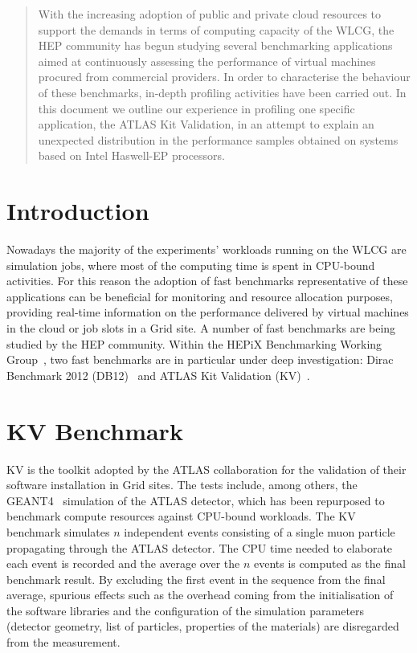 \begin{abstract}
With the increasing adoption of public and private cloud resources to support
the demands in terms of computing capacity of the WLCG, the HEP community has begun
studying several benchmarking applications aimed at continuously assessing the
performance of virtual machines procured from commercial providers.
In order to characterise the behaviour of these benchmarks, in-depth
profiling activities have been carried out. In this document we outline
our experience in profiling one specific application, the ATLAS Kit Validation,
in an attempt to explain an unexpected distribution in the performance samples
obtained on systems based on Intel Haswell-EP processors.
\end{abstract}


\section{Introduction}
Nowadays the majority of the experiments' workloads running on the WLCG are simulation 
jobs, where most of the computing time is spent in CPU-bound activities. For this 
reason the adoption of fast benchmarks representative of these applications
can be beneficial for monitoring and resource allocation purposes,
providing real-time information on the performance delivered by virtual 
machines in the cloud or job slots in a Grid site.
A number of fast benchmarks are being studied by the HEP community. Within the 
HEPiX Benchmarking Working Group~\cite{HEPiX:2014:HEPiX}, two fast benchmarks are 
in particular under deep investigation: Dirac Benchmark 2012 (DB12)~\cite{CERN:2016:DB12} 
and ATLAS Kit Validation (KV)~\cite{KV}.

\section{KV Benchmark}
KV is the toolkit adopted by the ATLAS collaboration for the
validation of their software installation in Grid sites. The tests include, among
others, the GEANT4~\cite{GEANT4} simulation of the ATLAS detector, which
has been repurposed to benchmark compute resources against CPU-bound 
workloads. The KV benchmark simulates $n$ independent events consisting of a single muon particle 
propagating through the ATLAS detector. The CPU time needed to elaborate each event 
is recorded and the average over the $n$ events is computed as the final benchmark result.
By excluding the first event in the sequence from the final average, spurious effects such as the 
overhead coming from the initialisation of the software libraries and the configuration 
of the simulation parameters (detector geometry, list of particles, properties of 
the materials) are disregarded from the measurement.

